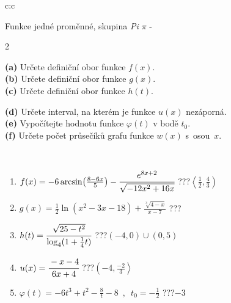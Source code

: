 \documentclass[10pt]{report}
\begin{document}
\begin{tabular}{c:c}
\begin{minipage}[c][104.5mm][t]{0.5\linewidth}
\begin{center}
\vspace{7mm}
{\huge Funkce jedné proměnné, skupina \textit{Pi $\pi$} -}\\[5mm]
\begin{minipage}{0.95\linewidth}
\begin{center}
{\small \begin{multicols}{2} \raggedright
\textbf{(a)} Určete definiční obor funkce \(f(x)\). \\[1mm]
\textbf{(b)} Určete definiční obor funkce \(g(x)\). \\[1mm]
\textbf{(c)} Určete definiční obor funkce \(h(t)\). \par \columnbreak
\textbf{(d)} Určete interval, na kterém je funkce \(u(x)\) nezáporná. \\[1mm]
\textbf{(e)} Vypočítejte hodnotu funkce \(\varphi(t)\) v bodě \(t_0\). \\[1mm]
\textbf{(f)} Určete počet průsečíků grafu funkce \(w(x)\) s~osou~\(x\). \\[1mm]
\end{multicols}
}
\end{center}
\end{minipage}
\\[4mm]
\begin{minipage}{0.79\linewidth}
\begin{center}
\begin{varwidth}{\linewidth}
\begin{enumerate}
\small
\item $f(x) = -6\arcsin\!\left( \frac{8-6x}{5} \right) - \cfrac{e^{8x+2}}{\sqrt{-12x^2+16x}}$\quad \dotfill\; ???\;\dotfill \quad $\left\langle\frac{1}{2} , \frac{4}{3}\right)$
\item $g(x) = \frac{1}{2} \ln{\!(x^2-3x-18)}+\frac{\sqrt[3]{4-x}}{x-7}$\quad \dotfill\; ???\;\dotfill {}
\item $h(t) = \cfrac{\sqrt{25-t^2}}{\log_4(1+\frac{1}{4}t)}$\quad \dotfill\; ???\;\dotfill \quad $\left(-4 , 0\right)\cup\left(0 , 5\right)$
\item $u(x) = \cfrac{-x-4}{6x+4}$\quad \dotfill\; ???\;\dotfill \quad $\left(-4 , \frac{-2}{3}\right\rangle$
\item $\varphi(t) = -6t^3+t^2-\frac{8}{t}-8 \enspace , \enspace t_0=-\frac{1}{2}$\quad \dotfill\; ???\;\dotfill \quad $-3$

\end{enumerate}
\end{varwidth}
\end{center}
\end{minipage}
\end{center}
\end{minipage}
\end{tabular}
\end{document}
